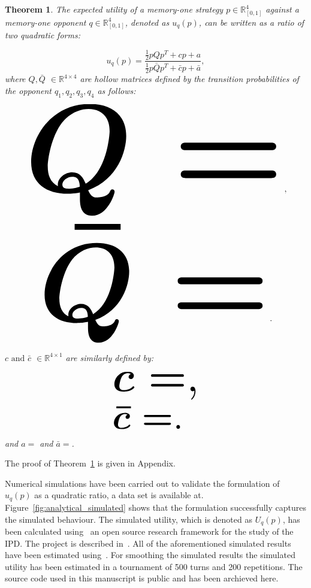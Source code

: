 \documentclass[10pt]{article}
\newcommand{\R}{\mathbb{R}}
\newtheorem{theorem}{Theorem}
\begin{document}
\begin{theorem}\label{theorem:quadratic_form_u}
    The expected utility of a memory-one strategy \(p\in\mathbb{R}_{[0,1]}^4\)
    against a memory-one opponent \(q\in\mathbb{R}_{[0,1]}^4\), denoted
    as \(u_q(p)\), can be written as a ratio of two quadratic forms:

    \begin{equation}\label{eq:optimisation_quadratic}
    u_q(p) = \frac{\frac{1}{2}pQp^T + cp + a}
                {\frac{1}{2}p\bar{Q}p^T + \bar{c}p + \bar{a}},
    \end{equation}
    where \(Q, \bar{Q}\) \(\in \R^{4\times4}\) are hollow matrices defined by the
    transition probabilities of the opponent \(q_1, q_2, q_3, q_4\) as follows:

    \begin{center}
    \begin{equation}
    \resizebox{0.9\linewidth}{!}{\arraycolsep=2.5pt%
    \boldmath\(
    Q = \)},
    \end{equation}
    \begin{equation}\label{eq:q_bar_matrix}
    \resizebox{0.8\linewidth}{!}{\arraycolsep=2.5pt%
    \boldmath\(
    \bar{Q} =  \)}.
    \end{equation}
    \end{center}

    \(c \text{ and } \bar{c}\) \(\in \R^{4 \times 1}\) are similarly defined by:

    \begin{equation}\label{eq:q_matrix_numerator}
    \resizebox{0.3\linewidth}{!}{\arraycolsep=2.5pt%
    \boldmath\(c = \),}
    \end{equation}
    \begin{equation}\label{eq:q_matrix_denominator}
    \resizebox{0.3\linewidth}{!}{\arraycolsep=2.5pt%
    \boldmath\(\bar{c} = \).
    }
    \end{equation}
    and \(a = \) and
    \(\bar{a} = \).
\end{theorem}

The proof of Theorem~\ref{theorem:quadratic_form_u} is given in Appendix. %

Numerical simulations have been carried out to validate the formulation of
\(u_q(p)\) as a quadratic ratio, a data set is available at.
Figure~\ref{fig:analytical_simulated} shows that the formulation successfully
captures the simulated behaviour. The simulated utility, which is denoted as
\(U_q(p)\), has been calculated using~\cite{axelrodproject} an open source
research framework for the study of the IPD. The project is described
in~\cite{Knight2016}. All of the aforementioned simulated results have been
estimated using~\cite{axelrodproject}. For smoothing the simulated results the
simulated utility has been estimated in a tournament of 500 turns and 200
repetitions. The source code used in this manuscript is public and has been
archieved here.
\end{document}

